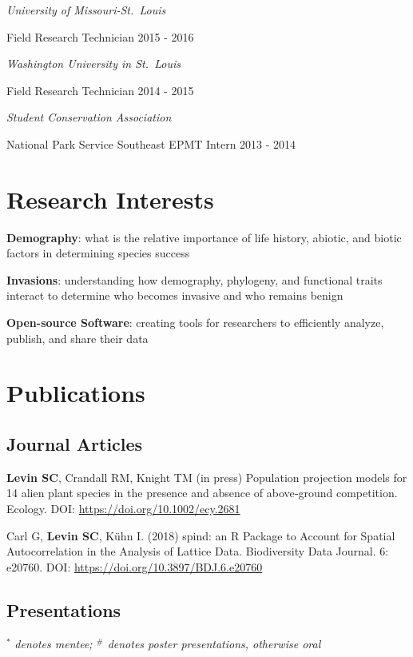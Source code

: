 \documentclass[11pt,]{article}
\begin{document}
\emph{University of Missouri-St.~Louis}

Field Research Technician \hfill 2015 - 2016

\emph{Washington University in St.~Louis}

Field Research Technician \hfill 2014 - 2015

\emph{Student Conservation Association}

National Park Service Southeast EPMT Intern \hfill 2013 - 2014

\section{Research Interests}\label{research-interests}

\textbf{Demography}: what is the relative importance of life history,
abiotic, and biotic factors in determining species success

\textbf{Invasions}: understanding how demography, phylogeny, and
functional traits interact to determine who becomes invasive and who
remains benign

\textbf{Open-source Software}: creating tools for researchers to
efficiently analyze, publish, and share their data

\section{Publications}\label{publications}

\subsection{Journal Articles}\label{journal-articles}

\textbf{Levin SC}, Crandall RM, Knight TM (in press) Population
projection models for 14 alien plant species in the presence and absence
of above‐ground competition. Ecology. DOI:
\url{https://doi.org/10.1002/ecy.2681}

Carl G, \textbf{Levin SC}, Kühn I. (2018) spind: an R Package to Account
for Spatial Autocorrelation in the Analysis of Lattice Data.
Biodiversity Data Journal. 6: e20760. DOI:
\url{https://doi.org/10.3897/BDJ.6.e20760}

\subsection{Presentations}\label{presentations}

\(^\ast\) \emph{denotes mentee; \(^\#\) denotes poster presentations,
otherwise oral}
\end{document}
